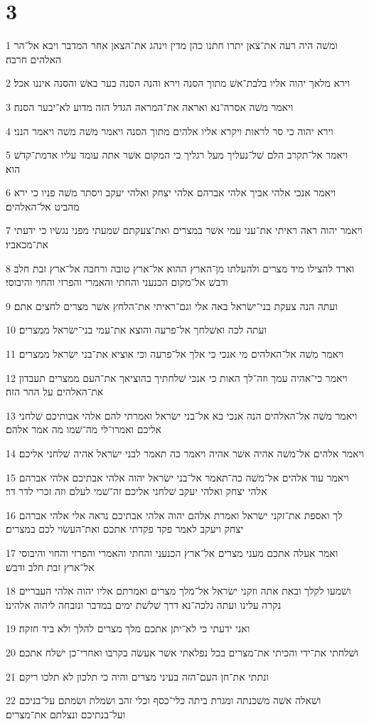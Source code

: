 \chapter{3}

\par 1 ומשׁה היה רעה את־צאן יתרו חתנו כהן מדין וינהג את־הצאן אחר המדבר ויבא אל־הר האלהים חרבה׃
\par 2 וירא מלאך יהוה אליו בלבת־אשׁ מתוך הסנה וירא והנה הסנה בער באשׁ והסנה איננו אכל׃
\par 3 ויאמר משׁה אסרה־נא ואראה את־המראה הגדל הזה מדוע לא־יבער הסנה׃
\par 4 וירא יהוה כי סר לראות ויקרא אליו אלהים מתוך הסנה ויאמר משׁה משׁה ויאמר הנני׃
\par 5 ויאמר אל־תקרב הלם שׁל־נעליך מעל רגליך כי המקום אשׁר אתה עומד עליו אדמת־קדשׁ הוא׃
\par 6 ויאמר אנכי אלהי אביך אלהי אברהם אלהי יצחק ואלהי יעקב ויסתר משׁה פניו כי ירא מהביט אל־האלהים׃
\par 7 ויאמר יהוה ראה ראיתי את־עני עמי אשׁר במצרים ואת־צעקתם שׁמעתי מפני נגשׂיו כי ידעתי את־מכאביו׃
\par 8 וארד להצילו מיד מצרים ולהעלתו מן־הארץ ההוא אל־ארץ טובה ורחבה אל־ארץ זבת חלב ודבשׁ אל־מקום הכנעני והחתי והאמרי והפרזי והחוי והיבוסי׃
\par 9 ועתה הנה צעקת בני־ישׂראל באה אלי וגם־ראיתי את־הלחץ אשׁר מצרים לחצים אתם׃
\par 10 ועתה לכה ואשׁלחך אל־פרעה והוצא את־עמי בני־ישׂראל ממצרים׃
\par 11 ויאמר משׁה אל־האלהים מי אנכי כי אלך אל־פרעה וכי אוציא את־בני ישׂראל ממצרים׃
\par 12 ויאמר כי־אהיה עמך וזה־לך האות כי אנכי שׁלחתיך בהוציאך את־העם ממצרים תעבדון את־האלהים על ההר הזה׃
\par 13 ויאמר משׁה אל־האלהים הנה אנכי בא אל־בני ישׂראל ואמרתי להם אלהי אבותיכם שׁלחני אליכם ואמרו־לי מה־שׁמו מה אמר אלהם׃
\par 14 ויאמר אלהים אל־משׁה אהיה אשׁר אהיה ויאמר כה תאמר לבני ישׂראל אהיה שׁלחני אליכם׃
\par 15 ויאמר עוד אלהים אל־משׁה כה־תאמר אל־בני ישׂראל יהוה אלהי אבתיכם אלהי אברהם אלהי יצחק ואלהי יעקב שׁלחני אליכם זה־שׁמי לעלם וזה זכרי לדר דר׃
\par 16 לך ואספת את־זקני ישׂראל ואמרת אלהם יהוה אלהי אבתיכם נראה אלי אלהי אברהם יצחק ויעקב לאמר פקד פקדתי אתכם ואת־העשׂוי לכם במצרים׃
\par 17 ואמר אעלה אתכם מעני מצרים אל־ארץ הכנעני והחתי והאמרי והפרזי והחוי והיבוסי אל־ארץ זבת חלב ודבשׁ׃
\par 18 ושׁמעו לקלך ובאת אתה וזקני ישׂראל אל־מלך מצרים ואמרתם אליו יהוה אלהי העבריים נקרה עלינו ועתה נלכה־נא דרך שׁלשׁת ימים במדבר ונזבחה ליהוה אלהינו׃
\par 19 ואני ידעתי כי לא־יתן אתכם מלך מצרים להלך ולא ביד חזקה׃
\par 20 ושׁלחתי את־ידי והכיתי את־מצרים בכל נפלאתי אשׁר אעשׂה בקרבו ואחרי־כן ישׁלח אתכם׃
\par 21 ונתתי את־חן העם־הזה בעיני מצרים והיה כי תלכון לא תלכו ריקם׃
\par 22 ושׁאלה אשׁה משׁכנתה ומגרת ביתה כלי־כסף וכלי זהב ושׂמלת ושׂמתם על־בניכם ועל־בנתיכם ונצלתם את־מצרים׃

